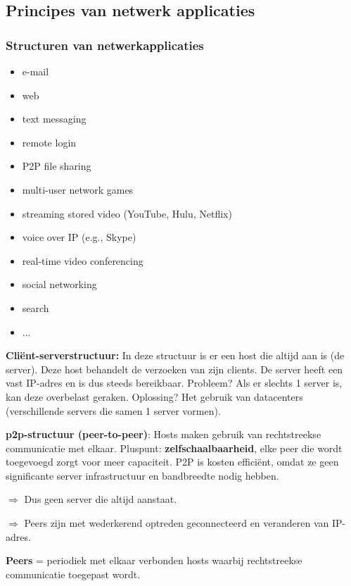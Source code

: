 \subsection{Principes van netwerk applicaties}

\subsubsection{Structuren van netwerkapplicaties}

\begin{multicols}{2}
  \begin{itemize}
      \item e-mail
 \item web
 \item text messaging
 \item remote login
 \item P2P file sharing
 \item multi-user network games
 \item streaming stored video (YouTube, Hulu, Netflix)
 \item voice over IP (e.g., Skype)
 \item real-time video conferencing
 \item social networking
 \item search
 \item ...
  \end{itemize}
\end{multicols}

\noindent \textbf{Cliënt-serverstructuur:} In deze structuur is er een host die altijd aan is (de server). Deze host behandelt de verzoeken van zijn clients. De server heeft een vast IP-adres en is dus steeds bereikbaar. Probleem? Als er slechts 1 server is, kan deze overbelast geraken. Oplossing? Het gebruik van datacenters (verschillende servers die samen 1 server vormen).

\noindent \textbf{\acrshort{p2p}-structuur (peer-to-peer)}: Hosts maken gebruik van rechtstreekse communicatie met elkaar. Pluspunt: \textbf{zelfschaalbaarheid}, elke peer die wordt toegevoegd zorgt voor meer capaciteit. P2P is kosten efficiënt, omdat ze geen significante server infrastructuur en bandbreedte nodig hebben.

\noindent $\Rightarrow$ Dus geen server die altijd aanstaat.

\noindent $\Rightarrow$ Peers zijn met wederkerend optreden geconnecteerd en veranderen van IP-adres.

\noindent \textbf{Peers} = periodiek met elkaar verbonden hosts waarbij rechtstreekse communicatie toegepast wordt.

